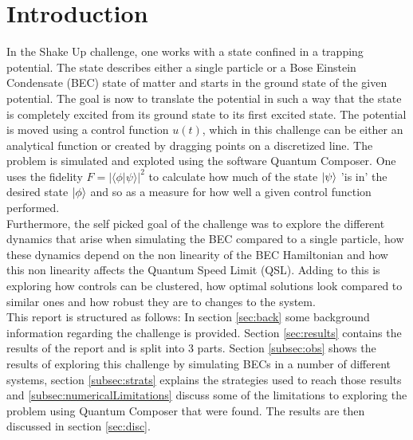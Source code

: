 \documentclass[aps,pra,reprint,superscriptaddress]{revtex4-1}
\begin{document}

\section{Introduction}
In the Shake Up challenge, one works with a state confined in a trapping potential. The state describes either a single particle or a Bose Einstein Condensate (BEC) state of matter and starts in the ground state of the given potential. The goal is now to translate the potential in such a way that the state is completely excited from its ground state to its first excited state. The potential is moved using a control function $u(t)$, which in this challenge can be either an analytical function or created by dragging points on a discretized line. The problem is simulated and exploted using the software Quantum Composer. One uses the fidelity $F = | \langle \phi | \psi \rangle |^2$ to calculate how much of the state $\ket{\psi}$ 'is in' the desired state $\ket{\phi}$ and so as a measure for how well a given control function performed.\\

Furthermore, the self picked goal of the challenge was to explore the different dynamics that arise when simulating the BEC compared to a single particle, how these dynamics depend on the non linearity of the BEC Hamiltonian and how this non linearity affects the Quantum Speed Limit (QSL). Adding to this is exploring how controls can be clustered, how optimal solutions look compared to similar ones and how robust they are to changes to the system.\\

This report is structured as follows: In section \ref{sec:back} some background information regarding the challenge is provided. Section \ref{sec:results} contains the results of the report and is split into 3 parts. Section \ref{subsec:obs} shows the results of exploring this challenge by simulating BECs in a number of different systems, section \ref{subsec:strats} explains the strategies used to reach those results and \ref{subsec:numericalLimitations} discuss some of the limitations to exploring the problem using Quantum Composer that were found. The results are then discussed in section \ref{sec:disc}. 
\end{document}
